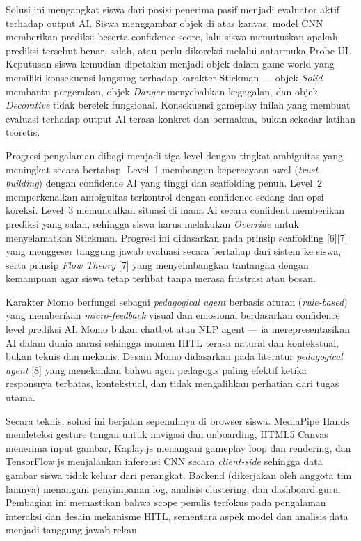 \documentclass[10pt,twoside,openright]{report}
\begin{document}
Solusi ini mengangkat siswa dari posisi penerima pasif menjadi evaluator aktif terhadap output AI. Siswa menggambar objek di atas kanvas, model CNN memberikan prediksi beserta confidence score, lalu siswa memutuskan apakah prediksi tersebut benar, salah, atau perlu dikoreksi melalui antarmuka Probe UI. Keputusan siswa kemudian dipetakan menjadi objek dalam game world yang memiliki konsekuensi langsung terhadap karakter Stickman --- objek \textit{Solid} membantu pergerakan, objek \textit{Danger} menyebabkan kegagalan, dan objek \textit{Decorative} tidak berefek fungsional. Konsekuensi gameplay inilah yang membuat evaluasi terhadap output AI terasa konkret dan bermakna, bukan sekadar latihan teoretis.

Progresi pengalaman dibagi menjadi tiga level dengan tingkat ambiguitas yang meningkat secara bertahap. Level~1 membangun kepercayaan awal (\textit{trust building}) dengan confidence AI yang tinggi dan scaffolding penuh. Level~2 memperkenalkan ambiguitas terkontrol dengan confidence sedang dan opsi koreksi. Level~3 memunculkan situasi di mana AI secara confident memberikan prediksi yang salah, sehingga siswa harus melakukan \textit{Override} untuk menyelamatkan Stickman. Progresi ini didasarkan pada prinsip scaffolding [6][7] yang menggeser tanggung jawab evaluasi secara bertahap dari sistem ke siswa, serta prinsip \textit{Flow Theory} [7] yang menyeimbangkan tantangan dengan kemampuan agar siswa tetap terlibat tanpa merasa frustrasi atau bosan.

Karakter Momo berfungsi sebagai \textit{pedagogical agent} berbasis aturan (\textit{rule-based}) yang memberikan \textit{micro-feedback} visual dan emosional berdasarkan confidence level prediksi AI. Momo bukan chatbot atau NLP agent --- ia merepresentasikan AI dalam dunia narasi sehingga momen HITL terasa natural dan kontekstual, bukan teknis dan mekanis. Desain Momo didasarkan pada literatur \textit{pedagogical agent} [8] yang menekankan bahwa agen pedagogis paling efektif ketika responsnya terbatas, kontekstual, dan tidak mengalihkan perhatian dari tugas utama.

Secara teknis, solusi ini berjalan sepenuhnya di browser siswa. MediaPipe Hands mendeteksi gesture tangan untuk navigasi dan onboarding, HTML5 Canvas menerima input gambar, Kaplay.js menangani gameplay loop dan rendering, dan TensorFlow.js menjalankan inferensi CNN secara \textit{client-side} sehingga data gambar siswa tidak keluar dari perangkat. Backend (dikerjakan oleh anggota tim lainnya) menangani penyimpanan log, analisis clustering, dan dashboard guru. Pembagian ini memastikan bahwa scope penulis terfokus pada pengalaman interaksi dan desain mekanisme HITL, sementara aspek model dan analisis data menjadi tanggung jawab rekan.
\end{document}

